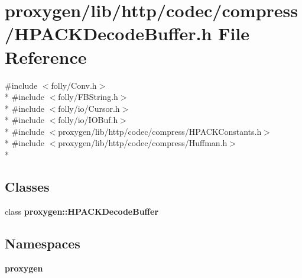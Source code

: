 \section{proxygen/lib/http/codec/compress/\+H\+P\+A\+C\+K\+Decode\+Buffer.h File Reference}
\label{HPACKDecodeBuffer_8h}
{\ttfamily \#include $<$folly/\+Conv.\+h$>$}\\*
{\ttfamily \#include $<$folly/\+F\+B\+String.\+h$>$}\\*
{\ttfamily \#include $<$folly/io/\+Cursor.\+h$>$}\\*
{\ttfamily \#include $<$folly/io/\+I\+O\+Buf.\+h$>$}\\*
{\ttfamily \#include $<$proxygen/lib/http/codec/compress/\+H\+P\+A\+C\+K\+Constants.\+h$>$}\\*
{\ttfamily \#include $<$proxygen/lib/http/codec/compress/\+Huffman.\+h$>$}\\*
\subsection*{Classes}
\begin{DoxyCompactItemize}
\item 
class {\bf proxygen\+::\+H\+P\+A\+C\+K\+Decode\+Buffer}
\end{DoxyCompactItemize}
\subsection*{Namespaces}
\begin{DoxyCompactItemize}
\item 
 {\bf proxygen}
\end{DoxyCompactItemize}

